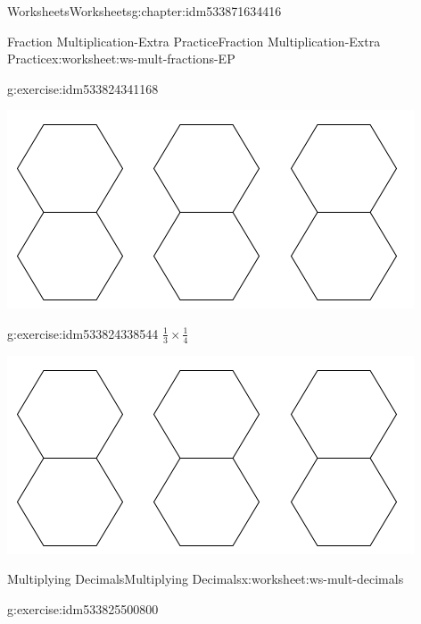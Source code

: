 \documentclass[twoside,11pt,]{book}
\begin{document}
\begin{chapterptx}{Worksheets}{}{Worksheets}{}{}{g:chapter:idm533871634416}
\begin{worksheet-section-numberless}{Fraction Multiplication-Extra Practice}{}{Fraction Multiplication-Extra Practice}{}{}{x:worksheet:ws-mult-fractions-EP}
\begin{divisionexercise}{5}{}{}{g:exercise:idm533824341168}
\begin{sidebyside}{1}{0.1}{0.1}{0}
\begin{sbspanel}{0.8}
\includegraphics[width=1\linewidth]{images/3-double-hexagons.png}
\end{sbspanel}%
\end{sidebyside}%
\end{divisionexercise}%
\begin{divisionexercise}{6}{}{}{g:exercise:idm533824338544}%
\(\frac{1}{3} \times \frac{1}{4} \)%
\begin{sidebyside}{1}{0.1}{0.1}{0}%
\begin{sbspanel}{0.8}%
\includegraphics[width=1\linewidth]{images/3-double-hexagons.png}
\end{sbspanel}%
\end{sidebyside}%
\end{divisionexercise}%
\end{worksheet-section-numberless}
\restoregeometry
%
%
\typeout{************************************************}
\typeout{************************************************}
%
\begin{worksheet-section-numberless}{Multiplying Decimals}{}{Multiplying Decimals}{}{}{x:worksheet:ws-mult-decimals}
\begin{divisionexercise}{1}{}{}{g:exercise:idm533825500800}%

\end{divisionexercise}
\end{worksheet-section-numberless}
\end{chapterptx}
\end{document}
